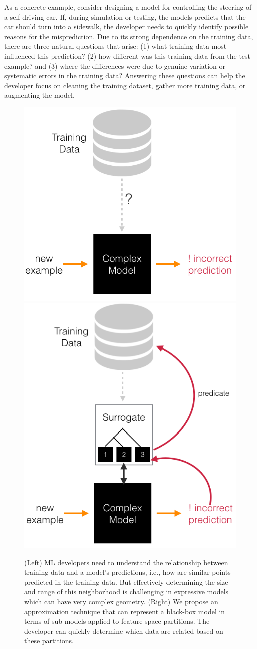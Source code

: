 As a concrete example, consider designing a model for controlling the steering of a self-driving car.
If, during simulation or testing, the models predicts that the car should turn into a sidewalk, the developer needs to quickly identify possible reasons for the misprediction.
Due to its strong dependence on the training data, there are three natural questions that arise:
(1) what training data most influenced this prediction? (2) how different was this training data from the test example? and (3) where the differences were due to genuine variation or systematic errors in the training data?
Answering these questions can help the developer focus on cleaning the training dataset, gather more training data, or augmenting the model.

\begin{figure}
    \centering
    \includegraphics[width=0.48\columnwidth]{figures/teaser1.png}
    \includegraphics[width=0.48\columnwidth]{figures/teaser2.png}
    \caption{(Left) ML developers need to understand the relationship between training data and a model's predictions, i.e., how are similar points predicted in the training data. But effectively determining the size and range of this neighborhood is challenging in expressive models which can have very complex geometry. (Right) We propose an approximation technique that can represent a black-box model in terms of sub-models applied to feature-space partitions. The developer can quickly determine which data are related based on these partitions.}
    \label{fig:my_label}
\end{figure}

